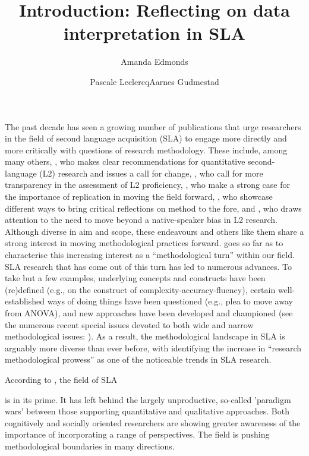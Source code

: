 \documentclass[output=paper]{../langscibook}
\author{Amanda Edmonds\affiliation{Université Paul-Valéry Montpellier 3}\orcid{}\and Pascale Leclercq\affiliation{Université Paul-Valéry Montpellier 3}\orcid{}\lastand Aarnes Gudmestad\affiliation{Virginia Polytechnic Institute and State University}\orcid{}}
\title{Introduction: Reflecting on data interpretation in SLA }
\begin{document}
\maketitle 


\noindent The past decade has seen a growing number of publications that urge researchers in the field of second language acquisition (SLA) to engage more directly and more critically with questions of research methodology. These include, among many others, \citet{Plonsky2014}, who makes clear recommendations for quantitative second-language (L2) research and issues a call for change, \citet{LeclercqEtAl2014}, who call for more transparency in the assessment of L2 proficiency, \citet{MarsdenEtAl2016}, who make a strong case for the importance of replication in moving the field forward, \citet{GudmestadEdmonds2018}, who showcase different ways to bring critical reflections on method to the fore, and \citet{Ortega2014ways}, who draws attention to the need to move beyond a native-speaker bias in L2 research. Although diverse in aim and scope, these endeavours and others like them share a strong interest in moving methodological practices forward. \citet[825]{Byrnes2013} goes so far as to characterise this increasing interest as a “methodological turn” within our field. SLA research that has come out of this turn has led to numerous advances. To take but a few examples, underlying concepts and constructs have been (re)defined (e.g., \citealt{Pallotti2009} on the construct of complexity-accuracy-fluency), certain well-established ways of doing things have been questioned (e.g.,  plea to move away from ANOVA), and new approaches have been developed and championed (see the numerous recent special issues devoted to both wide and narrow methodological issues: \citealt{NorrisEtAl2015,ChoiRichards2016,DeCostaEtAl2017, EdmondsEtAlinpress}). As a result, the methodological landscape in SLA is arguably more diverse than ever before, with \citet[5]{Ortega2013} identifying the increase in “research methodological prowess” as one of the noticeable trends in SLA research.

According to  \citet[214]{KingMackey2016}, the field of SLA

is in its prime. It has left behind the largely unproductive, so-called 'paradigm wars' between those supporting quantitative and qualitative approaches. Both cognitively and socially oriented researchers are showing greater awareness of the importance of incorporating a range of perspectives. The field is pushing methodological boundaries in many directions.
\end{document}
